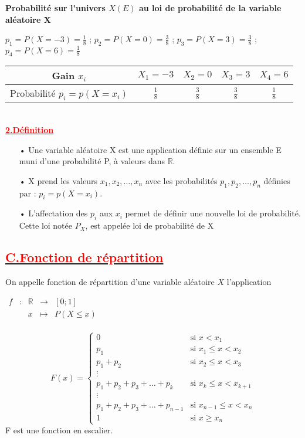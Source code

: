 \documentclass[12pt]{article}
\begin{document}
\textbf{Probabilité sur l'univers $X(E)$ au loi de probabilité de la variable aléatoire X}

$p_{1}=P(X=-3)=\frac{1}{8}$ ; $p_{2}=P(X=0)=\frac{3}{8}$ ; $p_{3}=P(X=3)=\frac{3}{8}$ ; $p_{4}=P(X=6)=\frac{1}{8}$

\begin{tabular}{|c|c|c|c|c|}
\hline
Gain $x_{i}$ & $X_{1}=-3$ & $X_{2}=0$ & $X_{3}=3$&$X_{4}=6$\\
\hline
Probabilité $p_{i} = p(X = x_{i}) $ &$\frac{1}{8}$ &$\frac{3}{8}$&$\frac{3}{8}$&$\frac{1}{8}$ \\
\hline
\end{tabular}
\\
\underline{\textbf{\textcolor{red}{2.Définition}}}
\begin{itemize}
\item[•] Une variable aléatoire X est une application définie sur un ensemble E muni d’une
probabilité P, à valeurs dans $\mathbb{R}$.
\item[•] X prend les valeurs $x_{1}, x_{2}, …, x_{n}$ avec les probabilités $p_{1}, p_{2}, …, p_{n}$ définies par : $p_{i} = p(X = x_{i})$.
\item[•] L’affectation des $p_{i}$ aux $x_{i}$ permet de définir une nouvelle loi de probabilité. Cette loi notée $P_{X}$, est appelée
loi de probabilité de X
\end{itemize} 
\subsection*{\underline{\textbf{\textcolor{red}{C.Fonction de répartition}}}}
On appelle fonction de répartition d'une variable aléatoire $X$ l'application

$\begin{array}{ccccc}
f & : & \mathbb{R} & \rightarrow & [0;1] \\
 & & x & \mapsto & P(X \leq x) \\
\end{array}$

\begin{equation*}
F(x)=\begin{cases}
0 & \text{si } x < x_{1}\\
p_{1} & \text{si } x_{1} \leq x < x_{2}\\
p_{1} + p_{2} & \text{si } x_{2} \leq x < x_{3}\\
\vdots \\
p_{1} + p_{2} + p_{3} + \ldots + p_{k} & \text{si } x_{k} \leq x < x_{k+1}\\
\vdots \\
p_{1} + p_{2} + p_{3} + \ldots + p_{n-1} & \text{si } x_{n-1} \leq x < x_{n}\\
1 & \text{si } x \geq x_{n}
\end{cases}
\end{equation*}
F  est une fonction en escalier.
\end{document}
